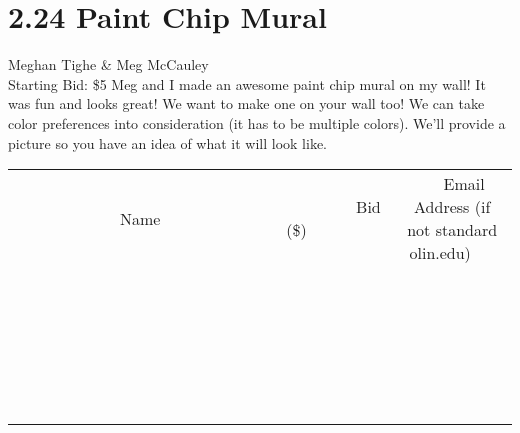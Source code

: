 \documentclass[11pt]{article}
\begin{document}
\section*{2.24 Paint Chip Mural}
Meghan Tighe \& Meg McCauley
\\
Starting Bid: \$5
\newline
Meg and I made an awesome paint chip mural on my wall! It was fun and looks great! We want to make one on your wall too! We can take color preferences into consideration (it has to be multiple colors).
We'll provide a picture so you have an idea of what it will look like.
\\[6ex]
\begin{tabular}{c c c}
~~~~~~~~~~~~~Name~~~~~~~~~~~~~ & ~~~~~~~~~Bid (\$)~~~~~~~~~  & ~~~Email Address (if not standard olin.edu)~~~\\
 & & \\
\hline
 & & \\
\hline
 & & \\
\hline
 & & \\
\hline
 & & \\
\hline
 & & \\
\hline
 & & \\
\hline
 & & \\
\hline
 & & \\
\hline
 & & \\
\hline
 & & \\
\hline
 & & \\
\hline
 & & \\
\hline
 & & \\
\hline
 & & \\
\hline
 & & \\
\hline
 & & \\
\hline
 & & \\
\hline
 & & \\
\hline
 & & \\
\hline
 & & \\
\hline
 & & \\
\hline
 & & \\
\hline
 & & \\
\hline
 & & \\
\hline
 & & \\
\hline
\end{tabular}
\newpage
\end{document}
